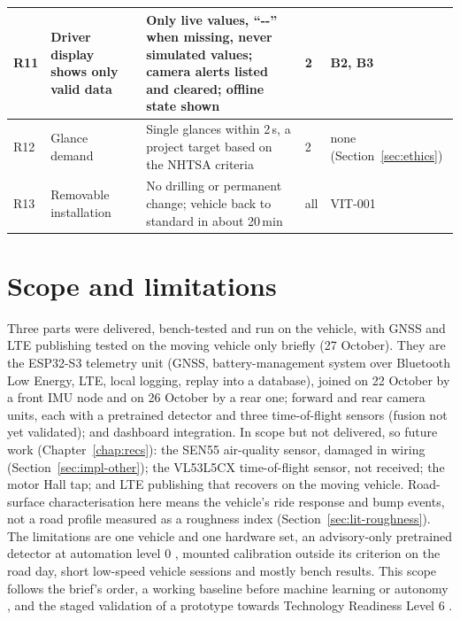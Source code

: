 \begin{table}[htbp]
\begin{tabular}{|p{0.7cm}|p{4.1cm}|p{6.3cm}|p{0.8cm}|p{1.7cm}|}
R11 & Driver display shows only valid data & Only live values, ``-{}-'' when missing, never simulated values; camera alerts listed and cleared; offline state shown & 2 & B2, B3 \\ \hline
R12 & Glance demand & Single glances within 2\,s, a project target based on the NHTSA criteria \cite{nhtsa2013} & 2 & none (Section~\ref{sec:ethics}) \\ \hline
R13 & Removable installation & No drilling or permanent change; vehicle back to standard in about 20\,min & all & VIT-001 \\ \hline
\end{tabular}
\end{table}

\section{Scope and limitations}
\label{sec:scope}

Three parts were delivered, bench-tested and run on the vehicle, with GNSS and LTE publishing tested on the moving vehicle only briefly (27 October). They are the ESP32-S3 telemetry unit (GNSS, battery-management system over Bluetooth Low Energy, LTE, local logging, replay into a database), joined on 22 October by a front IMU node and on 26 October by a rear one; forward and rear camera units, each with a pretrained detector and three time-of-flight sensors (fusion not yet validated); and dashboard integration. In scope but not delivered, so future work (Chapter~\ref{chap:recs}): the SEN55 air-quality sensor, damaged in wiring (Section~\ref{sec:impl-other}); the VL53L5CX time-of-flight sensor, not received; the motor Hall tap; and LTE publishing that recovers on the moving vehicle. Road-surface characterisation here means the vehicle's ride response and bump events, not a road profile measured as a roughness index \cite{fhwa2016} (Section~\ref{sec:lit-roughness}). The limitations are one vehicle and one hardware set, an advisory-only pretrained detector at automation level 0 \cite{saej3016}, mounted calibration outside its criterion on the road day, short low-speed vehicle sessions and mostly bench results. This scope follows the brief's order, a working baseline before machine learning or autonomy \cite{winberg2026}, and the staged validation of a prototype towards Technology Readiness Level 6 \cite{kimmel2020}.
